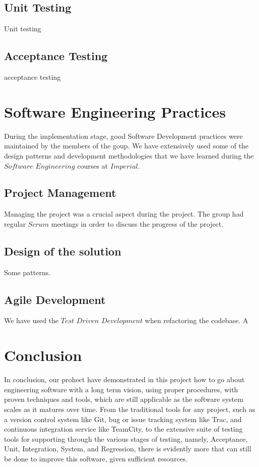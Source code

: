 \documentclass[11pt,twocolumn]{article} %
\begin{document}
\subsection{Unit Testing}
Unit testing

\subsection{Acceptance Testing}
acceptance testing

\section{Software Engineering Practices}
During the implementation stage, good Software  Development practices were maintained by the members of the goup.
We have extensively used some of the design patterns and development methodologies that we have learned during the $Software$ 
$Engineering$ courses at $Imperial$.

\subsection{Project Management}
Managing the project was a crucial aspect during the project. The group had regular $Scrum$ meetings in order to discuss  
the progress of the project. 

\subsection{Design of the solution}
Some patterns.


\subsection{Agile Development}
We have used the $Test$ $Driven$ $Development$ when refactoring the codebase.
A

\subsection{}

\section{Conclusion}
In conclusion, our prohect have demonstrated in this project how to go about engineering software
with a long term vision, using proper procedures, with proven techniques and tools, which
are still applicable as the software system scales as it matures over time.
From the traditional tools for any project, such as a version control system like Git, bug
or issue tracking system like Trac, and continuous integration service like TeamCity, to
the extensive suite of testing tools for supporting through the various stages of testing,
namely, Acceptance, Unit, Integration, System, and Regression, there is evidently more
that can still be done to improve this software, given sufficient resources.
\end{document}
